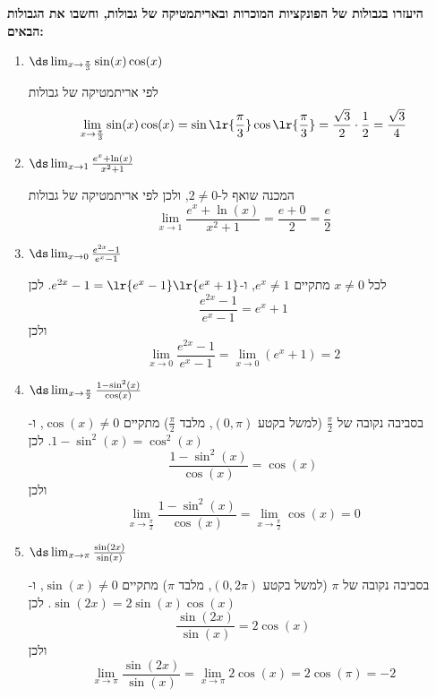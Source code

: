 \textbf{היעזרו בגבולות של הפונקציות המוכרות ובאריתמטיקה של גבולות, וחשבו את הגבולות הבאים:}
\begin{enumerate}
\item $\ds\lim_{x\to\frac\pi3}\sin(x)\cos(x)$
\ifsol
\begin{solbox}
לפי אריתמטיקה של גבולות
\[\lim_{x\to\frac\pi3}\sin(x)\cos(x)=\sin\lr{\frac\pi3}\cos\lr{\frac\pi3}=\frac{\sqrt3}{2}\cdot\frac12=\frac{\sqrt3}{4}\]
\end{solbox}
\fi
\item $\ds\lim_{x\to1}\frac{e^x+\ln(x)}{x^2+1}$
\ifsol
\begin{solbox}
המכנה שואף ל-$2\ne0$, ולכן לפי אריתמטיקה של גבולות
\[\lim_{x\to1}\frac{e^x+\ln(x)}{x^2+1}=\frac{e+0}{2}=\frac e2\]
\end{solbox}
\fi
\item $\ds\lim_{x\to0}\frac{e^{2x}-1}{e^x-1}$
\ifsol
{}
\begin{solbox}
לכל $x\ne0$ מתקיים $e^x\ne1$, ו-$e^{2x}-1=\lr{e^x-1}\lr{e^x+1}$. לכן
\[\frac{e^{2x}-1}{e^x-1}=e^x+1\]
ולכן
\[\lim_{x\to0}\frac{e^{2x}-1}{e^x-1}=\lim_{x\to0}\left(e^x+1\right)=2\]
\end{solbox}
\fi
\item $\ds\lim_{x\to\frac\pi2}\frac{1-\sin^2(x)}{\cos(x)}$
\ifsol
\begin{solbox}
בסביבה נקובה של $\frac\pi2$ (למשל בקטע $(0,\pi)$, מלבד $\frac\pi2$) מתקיים $\cos(x)\ne0$, ו-$1-\sin^2(x)=\cos^2(x)$. לכן
\[\frac{1-\sin^2(x)}{\cos(x)}=\cos(x)\]
ולכן
\[\lim_{x\to\frac\pi2}\frac{1-\sin^2(x)}{\cos(x)}=\lim_{x\to\frac\pi2}\cos(x)=0\]
\end{solbox}
\fi
\item $\ds\lim_{x\to\pi}\frac{\sin(2x)}{\sin(x)}$
\ifsol
\begin{solbox}
בסביבה נקובה של $\pi$ (למשל בקטע $(0,2\pi)$, מלבד $\pi$) מתקיים $\sin(x)\ne0$, ו-$\sin(2x)=2\sin(x)\cos(x)$. לכן
\[\frac{\sin(2x)}{\sin(x)}=2\cos(x)\]
ולכן
\[\lim_{x\to\pi}\frac{\sin(2x)}{\sin(x)}=\lim_{x\to\pi}2\cos(x)=2\cos(\pi)=-2\]
\end{solbox}
\fi
\eMs
\end{enumerate}
